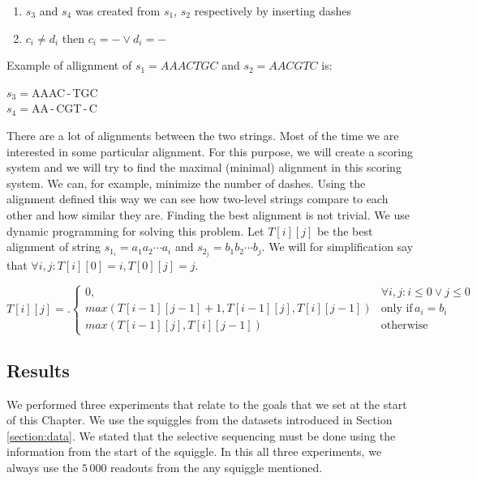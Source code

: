 \begin{enumerate}
\item $s_3$ and $s_4$ was created from $s_1$, $s_2$ respectively by inserting dashes
\item $c_i \neq d_i$ then $c_i = - \lor d_i = -$
\end{enumerate}

Example of allignment of $s_1 = AAACTGC$ and $s_2 = AACGTC$ is:

\begin{center}
$s_3 = $AAAC\,-\,TGC\\
$s_4 = $AA\,-\,CGT\,-\,C
\end{center}

There are a lot of alignments between the two strings. Most of the time we
are interested in some particular alignment. For this purpose, we will create a
scoring system and we will try to find the maximal (minimal) alignment in this scoring
system. We can, for example, minimize the number of dashes. Using the alignment
defined this way we can see how two-level strings compare to each other and how similar they are.
Finding the best alignment is not trivial. We use dynamic programming for
solving this problem. Let $T[i][j]$ be the best alignment of string $s_{1_i} = a_1a_2\cdots a_i$
and $s_{2_j} = b_1b_2\cdots b_j$. We will for simplification say that $\forall i, j: T[i][0] = i, T[0][j] = j$.

\[
T[i][j] = \bigl.
  \begin{cases}
    0, & \forall i,j : i\leq 0 \lor j\leq 0 \\
    max(T[i-1][j-1] + 1, T[i-1][j], T[i][j-1]) & \text{only if} \, a_i = b_i \\ 
    max(T[i-1][j], T[i][j-1]) & \text{otherwise}
  \end{cases}
\]

\subsection{Results}

We performed three experiments that relate to the goals that we set at the start
of this Chapter. We use the squiggles from the datasets introduced in Section
\ref{section:data}. We stated that the selective sequencing must be done using
the information from the start of the squiggle. In this all three experiments, we always use
the $5\,000$ readouts from the any squiggle mentioned. 

